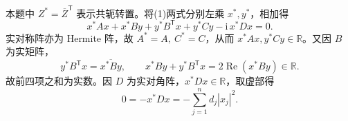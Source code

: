 \documentclass[11pt]{article}
\begin{document}
\begin{preview}
\begin{minipage}{164mm}
\setlength{\parindent}{0pt}
\setlength{\parskip}{3pt}
本题中 $Z^*=\overline Z^{\mathsf T}$ 表示共轭转置。将(1)两式分别左乘 $x^*,y^*$，相加得
\[
x^*Ax+x^*By+y^*B^{\mathsf T}x+y^*Cy-\mathrm i\,x^*Dx=0.
\]
实对称阵亦为 Hermite 阵，故 $A^*=A,\ C^*=C$，从而 $x^*Ax,y^*Cy\in\mathbb R$。又因 $B$ 为实矩阵，
\[
y^*B^{\mathsf T}x=\overline{x^*By},\qquad
x^*By+y^*B^{\mathsf T}x=2\operatorname{Re}(x^*By)\in\mathbb R.
\]
故前四项之和为实数。因 $D$ 为实对角阵，$x^*Dx\in\mathbb R$，取虚部得
\[
0=-x^*Dx=-\sum_{j=1}^n d_j|x_j|^2.
\]
\end{minipage}
\end{preview}
\end{document}
